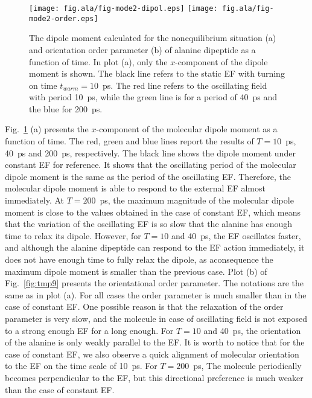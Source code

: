 \documentclass[a4paper,preprint,unsortedaddress,onecolumn]{revtex4-1}
\begin{document}
\begin{figure}
  \centering
  \texttt{[image: fig.ala/fig-mode2-dipol.eps]}
  \texttt{[image: fig.ala/fig-mode2-order.eps]}
  \caption{The dipole moment calculated for the nonequilibrium situation (a) and
    orientation order parameter (b) of alanine dipeptide as a
    function of time. In plot (a),
    only the $x$-component of the dipole moment is
    shown. The black line refers to the static EF with turning on
    time $t_{warm} = 10$~ps. The red line refers to the oscillating field with period
    10~ps, while the green line is for a period of 40~ps and the blue for 200~ps.}
  \label{fig:tmp8}
\end{figure}


Fig.~\ref{fig:tmp8} (a)
presents the $x$-component of the molecular dipole moment as
a function of time. The red, green and blue lines report the
results of $T=10$~ps, 40~ps and 200~ps, respectively. The black line
shows the dipole moment under constant EF
for reference.
It shows that the oscillating period of the molecular dipole moment
is the same as the period of the oscillating EF. Therefore,
the molecular dipole moment
is able to respond to the external EF almost immediately.
At $T=200$~ps, the maximum magnitude of the molecular
dipole moment is close to the values obtained in the case of constant EF, which
means that the variation of the oscillating EF is so slow that the
alanine has enough time to 
relax its dipole. However,
for $T=10$ and 40~ps, the EF oscillates faster,
and although the alanine dipeptide can respond to the EF action immediately,
it does not have enough time to fully relax the dipole, as aconsequence the maximum dipole moment is smaller than the previous case.
Plot (b) of Fig.~\ref{fig:tmp9} presents the orientational order
parameter. The notations are the same as in plot (a).
For all cases the order parameter is much
smaller than in the case of constant EF. One possible reason is that the
relaxation of the order parameter is very slow, and the molecule in case of oscillating field is
not exposed to a strong enough EF for a long enough. For  $T=10$ and 40~ps, the orientation of the alanine is only weakly
parallel to the EF. It is worth to notice that for the case of constant EF,
we also observe a quick alignment of molecular orientation to the EF
on the time scale of 10~ps. For $T=200$~ps, The molecule periodically
becomes perpendicular to the EF, but this directional preference is much
weaker than the case of constant EF.
\end{document}
